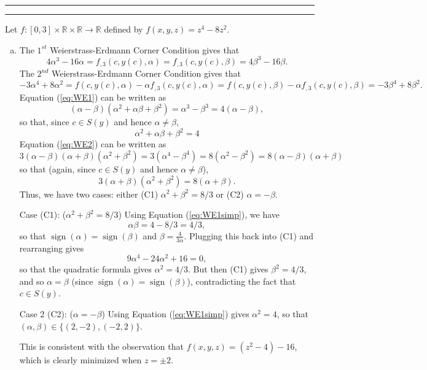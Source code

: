 \documentclass[11pt]{article}
\newcounter{questionCounter}
\newcounter{partCounter}[questionCounter]
\newenvironment{question}[2][\arabic{questionCounter}]{%
    \setcounter{partCounter}{0}%
    \vspace{.25in} \hrule \vspace{0.5em}%
        \noindent{\bf #2}%
    \vspace{0.8em} \hrule \vspace{.10in}%
    \addtocounter{questionCounter}{1}%
}{}
\newcommand{\R}{\mathbb{R}}             %
\newcommand{\sgn}{\operatorname{sign}}%
\begin{document}
\newpage
\begin{question}{Problem 4}
Let $f : [0,3] \times \R \times \R \to \R$ defined by $f(x,y,z) = z^4 - 8z^2$.
\begin{enumerate}[(a)]
\item The $1^{st}$ Weierstrass-Erdmann Corner Condition gives that
\begin{equation}
4\alpha^3 - 16\alpha
    = f_{,3}(c,y(c),\alpha)
    = f_{,3}(c,y(c),\beta)
    = 4\beta^3 - 16\beta.
\label{eq:WE1}
\end{equation}
The $2^{nd}$ Weierstrass-Erdmann Corner Condition gives that
\begin{equation}
- 3\alpha^4 + 8\alpha^2
    = f(c,y(c),\alpha) - \alpha f_{,3}(c,y(c),\alpha)  
    = f(c,y(c),\beta) - \alpha f_{,3}(c,y(c),\beta)     
    = - 3\beta^4 + 8\beta^2.
\label{eq:WE2}
\end{equation}
Equation (\ref{eq:WE1}) can be written as
\[(\alpha - \beta)(\alpha^2 + \alpha\beta + \beta^2)
    = \alpha^3 - \beta^3
    = 4(\alpha - \beta),
\]
so that, since $c \in S(y)$ and hence $\alpha \neq \beta$,
\begin{equation}
\alpha^2 + \alpha\beta + \beta^2 = 4
\label{eq:WE1simp}
\end{equation}
Equation (\ref{eq:WE2}) can be written as
\[3(\alpha - \beta)(\alpha + \beta)(\alpha^2 + \beta^2)
    = 3(\alpha^4 - \beta^4)
    = 8(\alpha^2 - \beta^2)
    = 8(\alpha - \beta)(\alpha + \beta)
\]
so that (again, since $c \in S(y)$ and hence $\alpha \neq \beta$),
\[3(\alpha + \beta)(\alpha^2 + \beta^2) = 8(\alpha + \beta).\]
Thus, we have two cases: either (C1) $\alpha^2 + \beta^2 = 8/3$ or (C2)
$\alpha = - \beta$.

Case (C1): ($\alpha^2 + \beta^2 = 8/3$) Using Equation (\ref{eq:WE1simp}), we have
\[\alpha\beta = 4 - 8/3 = 4/3,\]
so that $\sgn(\alpha) = \sgn(\beta)$ and $\beta = \frac{4}{3\alpha}$. Plugging
this back into (C1) and rearranging gives
\[9\alpha^4 - 24\alpha^2 + 16 = 0,\]
so that the quadratic formula gives $\alpha^2 = 4/3$. But then (C1) gives
$\beta^2 = 4/3$, and so $\alpha = \beta$ (since $\sgn(\alpha) = \sgn(\beta)$),
contradicting the fact that $c \in S(y)$.

Case 2 (C2): ($\alpha = -\beta$) Using Equation (\ref{eq:WE1simp}) gives
$\alpha^2 = 4$, so that $(\alpha,\beta) \in \{(2,-2),(-2,2)\}$.

This is consistent with the observation that $f(x,y,z) = (z^2 - 4) - 16$, which
is clearly minimized when $z = \pm 2$.


\end{enumerate}
\end{question}
\end{document}
